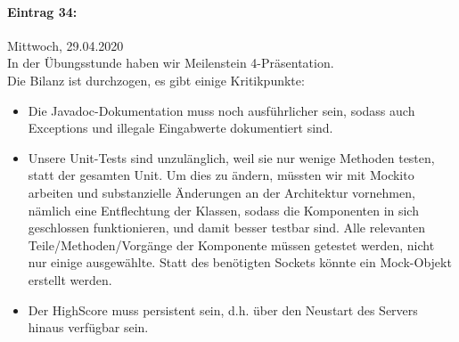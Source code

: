 \documentclass[12pt]{article}
\begin{document}
\paragraph{Eintrag 34:}
Mittwoch, 29.04.2020\\
In der \"Ubungsstunde haben wir Meilenstein 4-Pr\"asentation.\\
Die Bilanz ist durchzogen, es gibt einige Kritikpunkte:
\begin{itemize}
\item Die Javadoc-Dokumentation muss noch ausf\"uhrlicher sein, sodass auch Exceptions und illegale Eingabwerte dokumentiert sind.
\item Unsere Unit-Tests sind unzul\"anglich, weil sie nur wenige Methoden testen, statt der gesamten Unit. Um dies zu \"andern, m\"ussten wir mit Mockito arbeiten und substanzielle \"Anderungen an der Architektur vornehmen, n\"amlich eine Entflechtung der Klassen, sodass die Komponenten in sich geschlossen funktionieren, und damit besser testbar sind. Alle relevanten Teile/Methoden/Vorg\"ange der Komponente m\"ussen getestet werden, nicht nur einige ausgew\"ahlte. Statt des ben\"otigten Sockets k\"onnte ein Mock-Objekt erstellt werden.
\item Der HighScore muss persistent sein, d.h. \"uber den Neustart des Servers hinaus verf\"ugbar sein.
\end{itemize}
\end{document}
